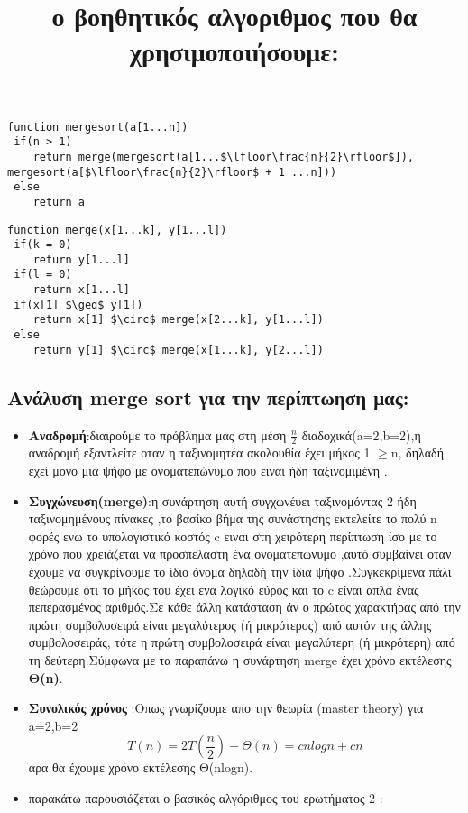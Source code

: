 \documentclass[a4paper, fleqn]{article}
\begin{document}
         \title{ο βοηθητικός αλγοριθμος που θα χρησιμοποιήσουμε:}
         


\lstset{frame=none}

\begin{tcolorbox}[colback=blue!20!white,colframe=purple!60!white,title=\textbf{Merge Sort}]
\begin{lstlisting}[mathescape]
function mergesort(a[1...n])
 if(n > 1)
 	return merge(mergesort(a[1...$\lfloor\frac{n}{2}\rfloor$]), mergesort(a[$\lfloor\frac{n}{2}\rfloor$ + 1 ...n]))
 else
 	return a
\end{lstlisting}

\begin{lstlisting}[mathescape]
function merge(x[1...k], y[1...l])
 if(k = 0)
 	return y[1...l]
 if(l = 0)
 	return x[1...l]
 if(x[1] $\geq$ y[1])
 	return x[1] $\circ$ merge(x[2...k], y[1...l])
 else
 	return y[1] $\circ$ merge(x[1...k], y[2...l])
\end{lstlisting}
\end{tcolorbox}

\subsection*{Ανάλυση merge sort για την περίπτωηση μας:}
\begin{itemize}
    \item \textbf{Αναδρομή}:διαιρούμε το πρόβλημα μας στη μέση $\frac{n}{2}$ διαδοχικά(a=2,b=2),η αναδρομή εξαντλείτε  οταν η ταξινομητέα ακολουθία έχει μήκος 1 $\geq$n, δηλαδή εχεί μονο μια ψήφο με ονοματεπώνυμο που ειναι ήδη ταξινομιμένη . 
\end{itemize}
    \begin{itemize}
        \item \textbf{Συγχώνευση(merge)}:η συνάρτηση αυτή συγχωνέυει ταξινομόντας 2 ήδη ταξινομημένους πίνακες ,το βασίκο βήμα της συνάστησης εκτελείτε το πολύ n φορές ενω το υπολογιστικό κοστός c ειναι στη χειρότερη περίπτωση  ίσο με το χρόνο που χρειάζεται να προσπελαστή ένα ονοματεπώνυμο ,αυτό συμβαίνει οταν έχουμε να συγκρίνουμε το ίδιο όνομα δηλαδή την ίδια ψήφο .Συγκεκρίμενα  πάλι θεώρουμε ότι το μήκος του έχει ενα λογικό εύρος και το c είναι απλα ένας πεπερασμένος αριθμός.Σε κάθε άλλη κατάσταση άν ο πρώτος χαρακτήρας από την πρώτη συμβολοσειρά είναι μεγαλύτερος (ή μικρότερος) από αυτόν της άλλης συμβολοσειράς, τότε η πρώτη συμβολοσειρά είναι μεγαλύτερη (ή μικρότερη) από τη δεύτερη.Σύμφωνα με τα παραπάνω η συνάρτηση merge έχει χρόνο εκτέλεσης \textbf{Θ(n)}.
    \end{itemize}
     \begin{itemize}
         \item \textbf{Συνολικός χρόνος} :Οπως  γνωρίζουμε απο την θεωρία (master theory) για a=2,b=2  $$Τ(n)=2T(\frac{n}{2})+Θ(n)=cnlogn+cn$$ αρα θα έχουμε χρόνο εκτέλεσης Θ(nlogn).
     \end{itemize}
\newpage
\begin{itemize}
    \item  παρακάτω παρουσιάζεται ο  βασικός αλγόριθμος του ερωτήματος 2 : 
             
\end{itemize}
\end{document}
